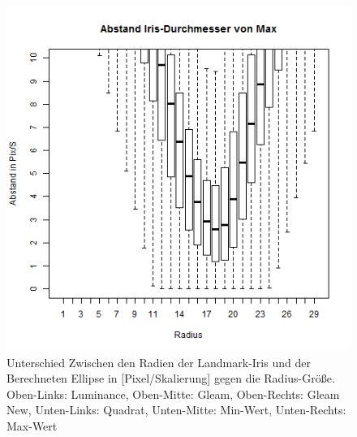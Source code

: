 \begin{figure}
	\includegraphics[width=0.32\linewidth]{Eye_Img_Box/Max_Radius_I}
	\caption{Unterschied Zwischen den Radien der Landmark-Iris und der Berechneten Ellipse in [Pixel/Skalierung] gegen die Radius-Größe.\\ Oben-Links: Luminance, Oben-Mitte: Gleam, Oben-Rechts: Gleam New, Unten-Links: Quadrat, Unten-Mitte: Min-Wert, Unten-Rechts: Max-Wert}
	\label{ElSe_Gray_Iris}
\end{figure}
